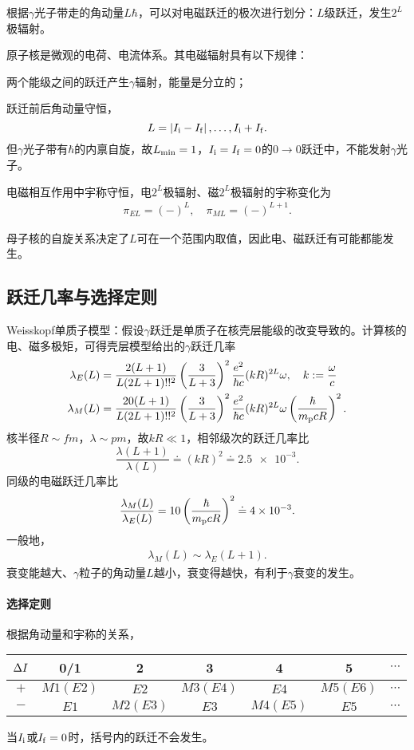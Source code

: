 根据$\gamma$光子带走的角动量$L\hbar$，可以对电磁跃迁的极次进行划分：$L$级跃迁，发生$2^L$极辐射。

原子核是微观的电荷、电流体系。其电磁辐射具有以下规律：
\begin{compactenum}
	\item 两个能级之间的跃迁产生$\gamma$辐射，能量是分立的；
	\item 跃迁前后角动量守恒，
	\[
		L=\left\lvert I_{\mathrm{i}}-I_{\mathrm{f}}\right\rvert,\ldots,I_{\mathrm{i}}+I_{\mathrm{f}}.
	\]
	但$\gamma$光子带有$\hbar$的内禀自旋，故$L_\mathrm{min}=1$，$I_{\mathrm{i}}=I_{\mathrm{f}}=0$的$0\to0$跃迁中，不能发射$\gamma$光子。
	\item 电磁相互作用中宇称守恒，电$2^L$极辐射、磁$2^L$极辐射的宇称变化为
	\begin{align}
		\pi_{EL}=(-)^L,\quad\pi_{ML}=(-)^{L+1}.
	\end{align}
\end{compactenum}
母子核的自旋关系决定了$L$可在一个范围内取值，因此电、磁跃迁有可能都能发生。

\subsection{\textgamma 跃迁几率与选择定则}

Weisskopf单质子模型：假设$\gamma$跃迁是单质子在核壳层能级的改变导致的。计算核的电、磁多极矩，可得壳层模型给出的$\gamma$跃迁几率
\begin{align*}
	\lambda_E(L)&=\frac{2(L+1)}{L(2L+1)!!^2}\left(\frac{3}{L+3}\right)^2\frac{e^2}{\hbar c}(kR)^{2L}\omega,\quad k:=\frac\omega{c}\\
	\lambda_M(L)&=\frac{20(L+1)}{L(2L+1)!!^2}\left(\frac{3}{L+3}\right)^2\frac{e^2}{\hbar c}(kR)^{2L}\omega\left(\frac\hbar{m_\mathrm p cR}\right)^2.
\end{align*}
核半径$R\sim\si{fm}$，$\lambda\sim\si{pm}$，故$kR\ll 1$，相邻级次的跃迁几率比
\[
	\frac{\lambda(L+1)}{\lambda(L)}\doteq(kR)^2\doteq\num{2.5e-3}.
\]
同级的电磁跃迁几率比
\[
	\frac{\lambda_M(L)}{\lambda_E(L)}=10\left(\frac\hbar{m_\mathrm p cR}\right)^2\doteq\num{4e-3}.
\]
一般地，
\begin{align}
	\lambda_M(L)\sim\lambda_E(L+1).
\end{align}
衰变能越大、$\gamma$粒子的角动量$L$越小，衰变得越快，有利于$\gamma$衰变的发生。%

\paragraph{选择定则}根据角动量和宇称的关系，
\begin{center}
	\begin{tabular}{ccccccc}
		\toprule
		$\Delta I$&0/1&2&3&4&5&$\cdots$\\
		\midrule
		$+$&$M1(E2)$&$E2$&$M3(E4)$&$E4$&$M5(E6)$&$\cdots$\\
		$-$&$E1$&$M2(E3)$&$E3$&$M4(E5)$&$E5$&$\cdots$\\
		\bottomrule
	\end{tabular}
\end{center}
\begin{remark}
	当$I_{\mathrm{i}}$或$I_{\mathrm{f}}=0$时，括号内的跃迁不会发生。
\end{remark}


